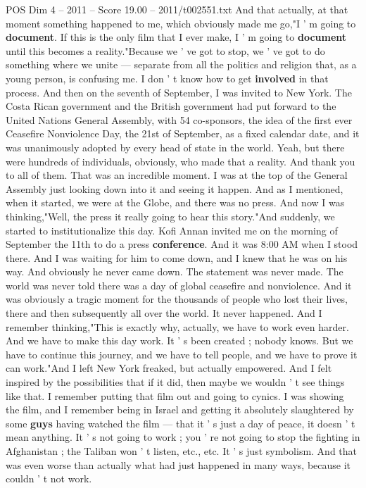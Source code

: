 \begin{textsample}{POS Dim 4 – 2011 – Score 19.00 – 2011/t002551.txt}
And that actually, at that moment something happened to me, which obviously made me go,"I ' m going to \textbf{document}.
If this is the only film that I ever make, I ' m going to \textbf{document} until this becomes a reality."Because we ' ve got to stop, we ' ve got to do something where we unite — separate from all the politics and religion that, as a young person, is confusing me.
I don ' t know how to get \textbf{involved} in that process.
And then on the seventh of September, I was invited to New York.
The Costa Rican government and the British government had put forward to the United Nations General Assembly, with 54 co-sponsors, the idea of the first ever Ceasefire Nonviolence Day, the 21st of September, as a fixed calendar date, and it was unanimously adopted by every head of state in the world.
Yeah, but there were hundreds of individuals, obviously, who made that a reality.
And thank you to all of them.
That was an incredible moment.
I was at the top of the General Assembly just looking down into it and seeing it happen.
And as I mentioned, when it started, we were at the Globe, and there was no press.
And now I was thinking,"Well, the press it really going to hear this story."And suddenly, we started to institutionalize this day.
Kofi Annan invited me on the morning of September the 11th to do a press \textbf{conference}.
And it was 8:00 AM when I stood there.
And I was waiting for him to come down, and I knew that he was on his way.
And obviously he never came down.
The statement was never made.
The world was never told there was a day of global ceasefire and nonviolence.
And it was obviously a tragic moment for the thousands of people who lost their lives, there and then subsequently all over the world.
It never happened.
And I remember thinking,"This is exactly why, actually, we have to work even harder.
And we have to make this day work.
It ' s been created ; nobody knows.
But we have to continue this journey, and we have to tell people, and we have to prove it can work."And I left New York freaked, but actually empowered.
And I felt inspired by the possibilities that if it did, then maybe we wouldn ' t see things like that.
I remember putting that film out and going to cynics.
I was showing the film, and I remember being in Israel and getting it absolutely slaughtered by some \textbf{guys} having watched the film — that it ' s just a day of peace, it doesn ' t mean anything.
It ' s not going to work ; you ' re not going to stop the fighting in Afghanistan ; the Taliban won ' t listen, etc., etc.
It ' s just symbolism.
And that was even worse than actually what had just happened in many ways, because it couldn ' t not work.

\end{textsample}
